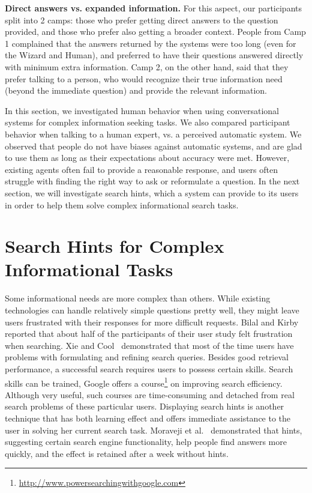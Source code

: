 \textbf{Direct answers vs. expanded information.}
For this aspect, our participants split into 2 camps: those who prefer getting direct answers to the question provided, and those who prefer also getting a broader context.
People from Camp 1 complained that the answers returned by the systems were too long (even for the Wizard and Human), and preferred to have their questions answered directly with minimum extra information.
Camp 2, on the other hand, said that they prefer talking to a person, who would recognize their true information need (beyond the immediate question) and provide the relevant information.


In this section, we investigated human behavior when using conversational systems for complex information seeking tasks.
We also compared participant behavior when talking to a human expert, vs. a perceived automatic system.
We observed that people do not have biases against automatic systems, and are glad to use them as long as their expectations about accuracy were met.
However, existing agents often fail to provide a reasonable response, and users often struggle with finding the right way to ask or reformulate a question.
In the next section, we will investigate search hints, which a system can provide to its users in order to help them solve complex informational search tasks.



\section{Search Hints for Complex Informational Tasks}
\label{section:conversation:hints}

Some informational needs are more complex than others.
While existing technologies can handle relatively simple questions pretty well, they might leave users frustrated with their responses for more difficult requests.
Bilal and Kirby~\cite{Bilal:2002:DSI:637512.637516} reported that about half of the participants of their user study felt frustration when searching.
Xie and Cool~\cite{xie2009understanding} demonstrated that most of the time users have problems with formulating and refining search queries.
Besides good retrieval performance, a successful search requires users to possess certain skills.
Search skills can be trained, \eg Google offers a course\footnote{\href{url}{http://www.powersearchingwithgoogle.com}} on improving search efficiency.
Although very useful, such courses are time-consuming and detached from real search problems of these particular users.
Displaying search hints is another technique that has both learning effect and offers immediate assistance to the user in solving her current search task.
Moraveji et al.~\cite{Moraveji:2011:MIU:2009916.2009966} demonstrated that hints, suggesting certain search engine functionality, help people find answers more quickly, and the effect is retained after a week without hints.

